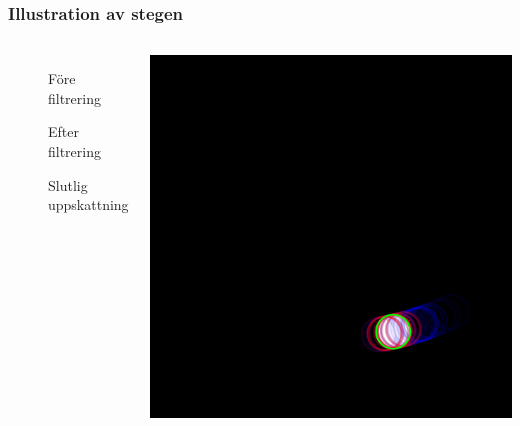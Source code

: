 \documentclass[]{beamer}
\renewcommand{\oe}{\"{o}}
\begin{document}
\begin{frame}
  \frametitle{Illustration av stegen}
  \begin{columns}[c]
    \column{2.5in}

    \begin{description}
      \item[] F\oe re filtrering
      \item[]
      \item[] Efter filtrering
      \item[]
      \item[] Slutlig uppskattning
    \end{description}
    
    \column{2in}
    
    \begin{center}
      \includegraphics[width=1\textwidth]{pendulum-tracking.png}
    \end{center}
  \end{columns}
\end{frame}
\end{document}
